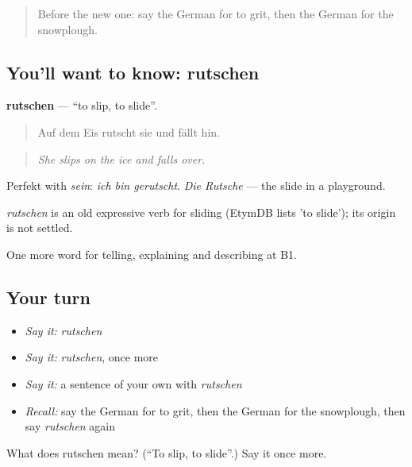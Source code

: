 \label{lesson:GE-C442-rutschen}



\begin{quote}
Before the new one: say the German for to grit, then the German for the snowplough.
\end{quote}

\subsection*{You'll want to know: rutschen}
\textbf{rutschen} — \textquotedblleft{}to slip, to slide\textquotedblright{}.

\begin{quote}
Auf dem Eis rutscht sie und fällt hin.
\end{quote}

\begin{quote}
\emph{She slips on the ice and falls over.}
\end{quote}

Perfekt with \emph{sein}: \emph{ich bin gerutscht}. \emph{Die Rutsche} — the slide in a playground.

\begin{cousinweb}
\emph{rutschen} is an old expressive verb for sliding (EtymDB lists 'to slide'); its origin is not settled.
\end{cousinweb}

\begin{grammarlens}[title={What you've built}]
One more word for telling, explaining and describing at B1.
\end{grammarlens}

\subsection*{Your turn}
\begin{itemize}
\raggedright
  \item \emph{Say it:} \emph{rutschen}
  \item \emph{Say it:} \emph{rutschen}, once more
  \item \emph{Say it:} a sentence of your own with \emph{rutschen}
  \item \emph{Recall:} say the German for to grit, then the German for the snowplough, then say \emph{rutschen} again
\end{itemize}

\begin{tcolorbox}[breakable,colback=teal!4,colframe=teal!35!black,title={Before you move on}]
What does rutschen mean? (\textquotedblleft{}To slip, to slide\textquotedblright{}.) Say it once more.
\end{tcolorbox}

